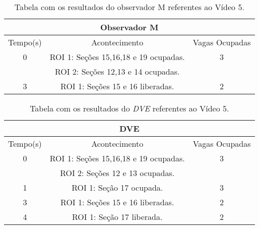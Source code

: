 \begin{table}[H]
\begin{center}
\begin{tabular}{|c||c||c|}
\hline
\multicolumn{3}{|c|}{Observador M}  \\ \hline \hline
Tempo(s) & Acontecimento & Vagas Ocupadas\\ \hline
0 & ROI 1: Seções 15,16,18 e 19 ocupadas. & 3 \\
 & ROI 2: Seções 12,13 e 14 ocupadas. &  \\ \hline
3 & ROI 1: Seções 15 e 16 liberadas. & 2 \\
\hline
\end{tabular}
\end{center}
\caption{Tabela com os resultados do observador M referentes ao Vídeo 5.}
\label{tab:video5M}
\end{table}

\begin{table}[H]
\begin{center}
\begin{tabular}{|c||c||c|}
\hline
\multicolumn{3}{|c|}{DVE}  \\ \hline \hline
Tempo(s) & Acontecimento & Vagas Ocupadas\\ \hline
0 & ROI 1: Seções 15,16,18 e 19 ocupadas. & 3 \\
 & ROI 2: Seções 12 e 13 ocupadas. &  \\ \hline
1 & ROI 1: Seção 17 ocupada. & 3 \\ \hline
3 & ROI 1: Seções 15 e 16 liberadas. & 2 \\ \hline
4 & ROI 1: Seção 17 liberada. & 2 \\
\hline
\end{tabular}
\end{center}
\caption{Tabela com os resultados do \textit{DVE} referentes ao Vídeo 5.}
\label{tab:video5}
\end{table}

